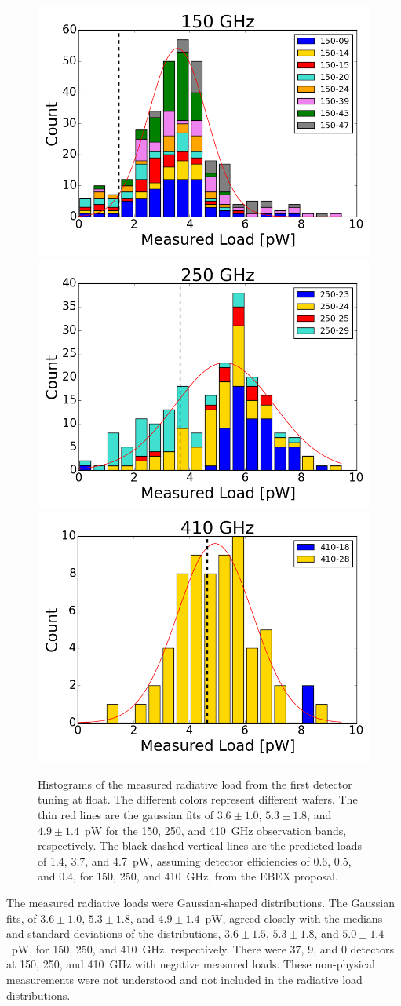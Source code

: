 \begin{figure}[ht!]
\begin{center}
\includegraphics[width=0.32\columnwidth]{figures/thesis_150_radiative_load_hist.png}
\includegraphics[width=0.32\columnwidth]{figures/thesis_250_radiative_load_hist.png}
\includegraphics[width=0.32\columnwidth]{figures/thesis_410_radiative_load_hist.png}
\caption{Histograms of the measured radiative load from the first detector tuning at float. 
The different colors represent different wafers.  
The thin red lines are the gaussian fits of $3.6\pm1.0, \, 5.3\pm1.8$, and $4.9\pm1.4$~pW for the 150, 250, and 410~GHz observation bands, respectively. 
The black dashed vertical lines are the predicted loads of 1.4, 3.7, and 4.7~pW, assuming detector efficiencies of 0.6, 0.5, and 0.4, for 150, 250, and 410~GHz, from the \ac{EBEX} proposal. 
\label{fig:radiative_load_histograms} }
\end{center}
\end{figure}

The measured radiative loads were Gaussian-shaped distributions. 
The Gaussian fits, of $3.6\pm 1.0, \, 5.3\pm 1.8$, and $4.9 \pm 1.4$~pW, agreed closely with the  medians and standard deviations of the distributions, $3.6\pm1.5, \, 5.3\pm1.8$, and $5.0\pm1.4$~pW, 
for 150, 250, and 410~GHz, respectively. 
There were 37, 9, and 0 detectors at 150, 250, and 410~GHz with negative measured loads. 
These non-physical measurements were not understood and not included in the radiative load distributions. 

